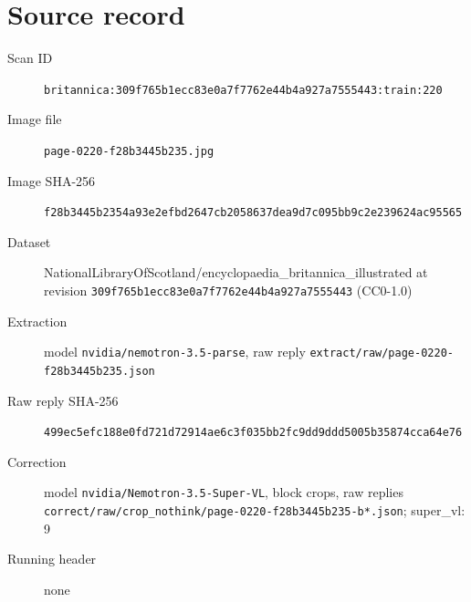\documentclass{article}
\begin{document}
\section*{Source record}
\begin{description}
\item[Scan ID] \texttt{britannica:309f765b1ecc83e0a7f7762e44b4a927a7555443:train:220}
\item[Image file] \texttt{page-0220-f28b3445b235.jpg}
\item[Image SHA-256] \texttt{f28b3445b2354a93e2efbd2647cb2058637dea9d7c095bb9c2e239624ac95565}
\item[Dataset] NationalLibraryOfScotland/encyclopaedia\_britannica\_illustrated at revision \texttt{309f765b1ecc83e0a7f7762e44b4a927a7555443} (CC0-1.0)
\item[Extraction] model \texttt{nvidia/nemotron-3.5-parse}, raw reply \texttt{extract/raw/page-0220-f28b3445b235.json}
\item[Raw reply SHA-256] \texttt{499ec5efc188e0fd721d72914ae6c3f035bb2fc9dd9ddd5005b35874cca64e76}
\item[Correction] model \texttt{nvidia/Nemotron-3.5-Super-VL}, block crops, raw replies \texttt{correct/raw/crop\_nothink/page-0220-f28b3445b235-b*.json}; super\_vl: 9
\item[Running header] none
\end{description}
\end{document}
